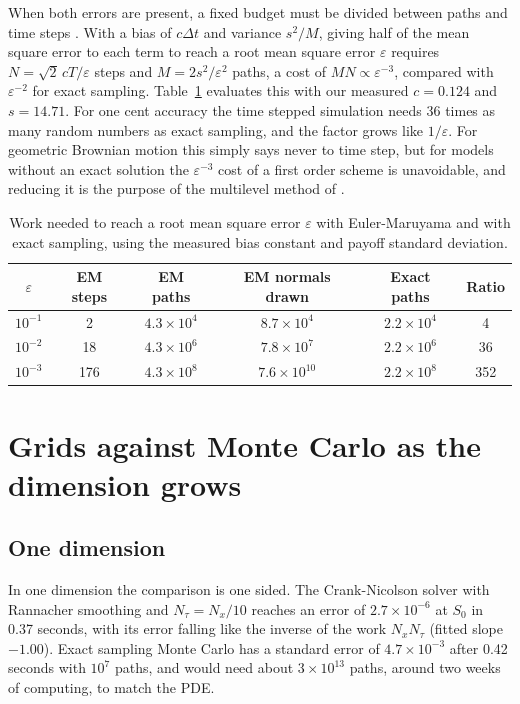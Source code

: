 \documentclass[11pt,a4paper]{article}
\begin{document}
When both errors are present, a fixed budget must be divided between paths and time steps \citep{duffie1995}. With a bias of $c\Delta t$ and variance $s^2/M$, giving half of the mean square error to each term to reach a root mean square error $\varepsilon$ requires $N = \sqrt{2}\,cT/\varepsilon$ steps and $M = 2s^2/\varepsilon^2$ paths, a cost of $MN \propto \varepsilon^{-3}$, compared with $\varepsilon^{-2}$ for exact sampling. Table~\ref{tab:cost} evaluates this with our measured $c = 0.124$ and $s = 14.71$. For one cent accuracy the time stepped simulation needs 36 times as many random numbers as exact sampling, and the factor grows like $1/\varepsilon$. For geometric Brownian motion this simply says never to time step, but for models without an exact solution the $\varepsilon^{-3}$ cost of a first order scheme is unavoidable, and reducing it is the purpose of the multilevel method of \citet{giles2008}.

\begin{table}[htbp]
\centering
\caption{Work needed to reach a root mean square error $\varepsilon$ with Euler-Maruyama and with exact sampling, using the measured bias constant and payoff standard deviation.}
\label{tab:cost}
\begin{tabular}{cccccc}
\toprule
$\varepsilon$ & EM steps & EM paths & EM normals drawn & Exact paths & Ratio \\
\midrule
$10^{-1}$ & 2 & $4.3\times10^{4}$ & $8.7\times10^{4}$ & $2.2\times10^{4}$ & 4 \\
$10^{-2}$ & 18 & $4.3\times10^{6}$ & $7.8\times10^{7}$ & $2.2\times10^{6}$ & 36 \\
$10^{-3}$ & 176 & $4.3\times10^{8}$ & $7.6\times10^{10}$ & $2.2\times10^{8}$ & 352 \\
\bottomrule
\end{tabular}
\end{table}

\section{Grids against Monte Carlo as the dimension grows}\label{sec:dim}

\subsection{One dimension}

In one dimension the comparison is one sided. The Crank-Nicolson solver with Rannacher smoothing and $N_\tau = N_x/10$ reaches an error of $2.7\times10^{-6}$ at $S_0$ in 0.37 seconds, with its error falling like the inverse of the work $N_xN_\tau$ (fitted slope $-1.00$). Exact sampling Monte Carlo has a standard error of $4.7\times10^{-3}$ after 0.42 seconds with $10^7$ paths, and would need about $3\times10^{13}$ paths, around two weeks of computing, to match the PDE.
\end{document}
